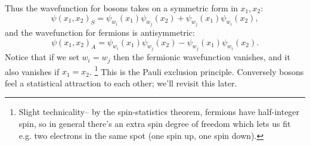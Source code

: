 %
Thus the wavefunction for bosons takes on a symmetric form in $x_1,x_2$:
\begin{equation}
    \psi(x_1,x_2)_S = \psi_{w_i}(x_1) \psi_{w_j}(x_2) + \psi_{w_j}(x_1) \psi_{w_i}(x_2),
\end{equation}
and the wavefunction for fermions is antisymmetric:
\begin{equation}
    \psi(x_1,x_2)_A = \psi_{w_i}(x_1) \psi_{w_j}(x_2) - \psi_{w_j}(x_1) \psi_{w_i}(x_2).
\end{equation}
Notice that if we set $w_i=w_j$ then the fermionic wavefunction vanishes, and it also vanishes if $x_1=x_2$.%
    \footnote{Slight technicality-- by the spin-statistics theorem, fermions have half-integer spin, so in general there's an extra spin degree of freedom which lets us fit e.g. two electrons in the same spot (one spin up, one spin down).}
This is the Pauli exclusion principle. Conversely bosons feel a statistical attraction to each other; we'll revisit this later.